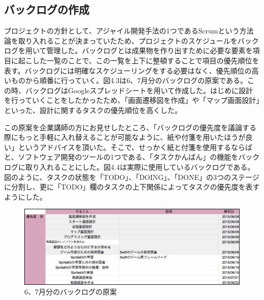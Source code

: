 \documentclass[openany,11pt,papersize]{jsbook}
\begin{document}
\subsection{バックログの作成}
\par プロジェクトの方針として、アジャイル開発手法の1つであるScrumという方法論を取り入れることが決まっていたため、プロジェクトのスケジュールをバックログを用いて管理した。バックログとは成果物を作り出すために必要な要素を項目に起こした一覧のことで、この一覧を上下に整頓することで項目の優先順位を表す。バックログには明確なスケジューリングをする必要はなく、優先順位の高いものから順番に行っていく。図4.3は6、7月分のバックログの原案である。この時、バックログはGoogleスプレッドシートを用いて作成した。はじめに設計を行っていくことをしたかったため、「画面遷移図を作成」や「マップ画面設計」といった、設計に関するタスクの優先順位を高くした。

\par この原案を企業講師の方にお見せしたところ、「バックログの優先度を議論する際にもっと手軽に入れ替えることが可能なように、紙や付箋を用いたほうが良い」というアドバイスを頂いた。そこで、せっかく紙と付箋を使用するならばと、ソフトウェア開発のツールの1つである、「タスクかんばん」の機能をバックログに取り入れることにした。図4.4は実際に使用しているバックログである。図のように、タスクの状態を「TODO」、「DOING」、「DONE」の3つのステージに分割し、更に「TODO」欄のタスクの上下関係によってタスクの優先度を表すようにした。

\begin{figure}[H]
\begin{center}
\includegraphics[width=14cm, bb=0 0 1020 359]{img/SprintBacklog.png}
\end{center}
\caption{6、7月分のバックログの原案}
\end{figure}
\end{document}

